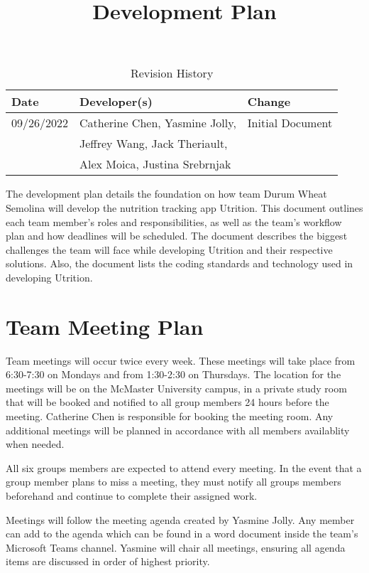 \documentclass{article}
\title{Development Plan\\\progname}
\author{\authname}
\date{}
\begin{document}
\begin{table}[hp]
\caption{Revision History} \label{TblRevisionHistory}
\begin{tabularx}{\textwidth}{llX}
\toprule
\textbf{Date} & \textbf{Developer(s)} & \textbf{Change}\\
\midrule
09/26/2022 & Catherine Chen, Yasmine Jolly, &Initial Document\\ 
&Jeffrey Wang, Jack Theriault, &\\
&Alex Moica, Justina Srebrnjak &\\
\bottomrule
\end{tabularx}
\end{table}

\newpage

\maketitle

The development plan details the foundation on how team Durum Wheat Semolina will develop the nutrition tracking app Utrition. This document outlines each team member’s roles and responsibilities, as well as the team’s workflow plan and how deadlines will be scheduled. The document describes the biggest challenges the team will face while developing Utrition and their respective solutions. Also, the document lists the coding standards and technology used in developing Utrition.

\section{Team Meeting Plan}

Team meetings will occur twice every week. These meetings will take place from 6:30-7:30 on Mondays and from 1:30-2:30 on Thursdays. The location for the meetings will be on the McMaster University campus, in a private study room that will be booked and notified to all group members 24 hours before the meeting. Catherine Chen is responsible for booking the meeting room. Any additional meetings will be planned in accordance with all members availablity when needed.

All six groups members are expected to attend every meeting. In the event that a group member plans to miss a meeting, they must notify all groups members beforehand and continue to complete their assigned work.

Meetings will follow the meeting agenda created by Yasmine Jolly. Any member can add to the agenda which can be found in a word document inside the team's Microsoft Teams channel. Yasmine will chair all meetings, ensuring all agenda items are discussed in order of highest priority.
\end{document}
